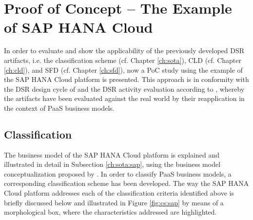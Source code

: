 \chapter{Proof of Concept -- The Example of SAP HANA Cloud}\label{ch:poc}

In order to evaluate and show the applicability of the previously developed \ac{DSR} artifacts, i.e. the classification scheme (cf. Chapter \ref{ch:sota}), \ac{CLD} (cf. Chapter \ref{ch:cld}), and \ac{SFD} (cf. Chapter \ref{ch:sfd}), now a \acf{PoC} study using the example of the SAP HANA Cloud platform is presented. This approach is in conformity with the \ac{DSR} design cycle of \citet[pp. 88,90-91]{Hevner2007} and the \ac{DSR} activity evaluation according to \citet[p. 56]{Peffers2007}, whereby the artifacts have been evaluated against the real world by their reapplication in the context of \ac{PaaS} business models.

\section{Classification}\label{ch:poc:cs}

The business model of the SAP HANA Cloud platform is explained and illustrated in detail in Subsection \ref{ch:sota:sap}, using the business model conceptualization proposed by \citet{Johnson2008}. In order to classify \ac{PaaS} business models, a corresponding classification scheme has been developed. The way the SAP HANA Cloud platform addresses each of the classification criteria identified above is briefly discussed below and illustrated in Figure \ref{fig:cs:sap} by means of a morphological box, where the characteristics addressed are highlighted.

